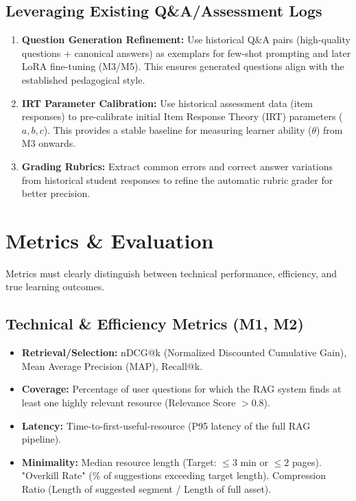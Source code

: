 \documentclass[12pt]{article}
\begin{document}
\begin{enumerate}
\subsection{Leveraging Existing Q\&A/Assessment Logs}
\begin{enumerate}
    \item \textbf{Question Generation Refinement:} Use historical Q\&A pairs (high-quality questions + canonical answers) as exemplars for few-shot prompting and later LoRA fine-tuning (M3/M5). This ensures generated questions align with the established pedagogical style.
    \item \textbf{IRT Parameter Calibration:} Use historical assessment data (item responses) to pre-calibrate initial Item Response Theory (IRT) parameters ($a, b, c$). This provides a stable baseline for measuring learner ability ($\theta$) from M3 onwards.
    \item \textbf{Grading Rubrics:} Extract common errors and correct answer variations from historical student responses to refine the automatic rubric grader for better precision.
\end{enumerate}

\section{Metrics \& Evaluation}

Metrics must clearly distinguish between technical performance, efficiency, and true learning outcomes.

\subsection{Technical \& Efficiency Metrics (M1, M2)}
\begin{itemize}[noitemsep]
    \item \textbf{Retrieval/Selection:} nDCG@k (Normalized Discounted Cumulative Gain), Mean Average Precision (MAP), Recall@k.
    \item \textbf{Coverage:} Percentage of user questions for which the RAG system finds at least one highly relevant resource (Relevance Score $> 0.8$).
    \item \textbf{Latency:} Time-to-first-useful-resource (P95 latency of the full RAG pipeline).
    \item \textbf{Minimality:} Median resource length (Target: $\le 3$ min or $\le 2$ pages). "Overkill Rate" (\% of suggestions exceeding target length). Compression Ratio (Length of suggested segment / Length of full asset).
\end{itemize}


\end{enumerate}
\end{document}

